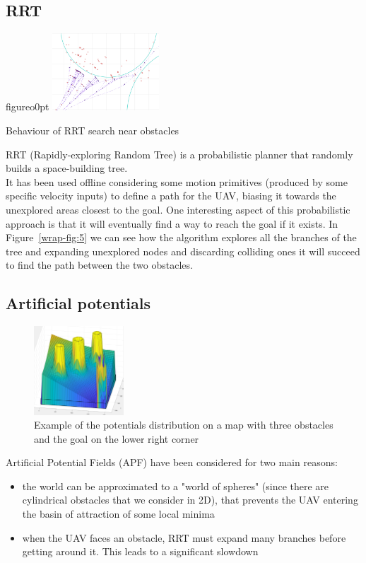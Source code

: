 \documentclass[oneside,onecolumn]{article}
\begin{document}
\subsection{RRT}

\begin{wrapfloat}{figure}{o}{0pt}
  \includegraphics[width=0.3\textwidth]{rrt}
  \caption{Behaviour of RRT search near obstacles}\label{wrap-fig:5}
\end{wrapfloat} 

RRT (Rapidly-exploring Random Tree) is a probabilistic planner that randomly builds a space-building tree.\\
It has been used offline considering some motion primitives (produced by some specific velocity inputs) to define a path for the UAV, biasing it towards the unexplored areas closest to the goal.
One interesting aspect of this probabilistic approach is that it will eventually
find a way to reach the goal if it exists. In Figure~\ref{wrap-fig:5} we can see
how the algorithm explores all the branches of the tree and expanding unexplored
nodes and discarding colliding ones it will succeed to find the path between the
two obstacles.
\subsection{Artificial potentials}
\begin{figure}
\centering
\includegraphics[width=0.3\textwidth]{artPotFields}
\caption{Example of the potentials distribution on a map with three obstacles
    and the goal on the lower right corner}
\label{wrap-fig:6}
\end{figure}

Artificial Potential Fields (APF) have been considered for two main reasons:
\begin{itemize}
\item the world can be approximated to a "world of spheres" (since there are cylindrical obstacles that we consider in 2D), that prevents the UAV entering the basin of attraction of some local minima
\item when the UAV faces an obstacle, RRT must expand many branches before getting around it. This leads to a significant slowdown
\end{itemize}
\end{document}
